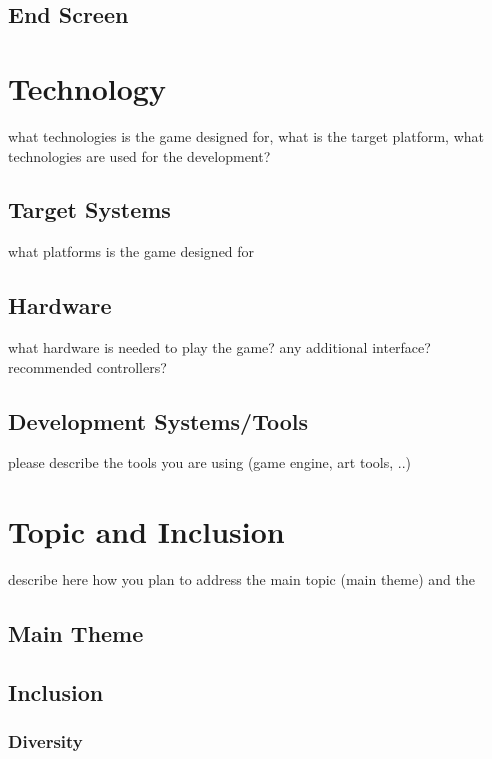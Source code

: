 \documentclass[a4paper]{scrreprt}
\begin{document}
\section{End Screen}



\chapter{Technology}
what technologies is the game designed for, what is the target platform, what technologies are used for the development? 

\section{Target Systems}
what platforms is the game designed for

\section{Hardware}
what hardware is needed to play the game? any additional interface? recommended controllers? 

\section{Development Systems/Tools}
please describe the tools you are using (game engine, art tools, ..) 



\chapter{Topic and Inclusion }

describe here how you plan to address the main topic (main theme) and the 

\section{Main Theme}
\section{Inclusion}

\subsection{Diversity}
\end{document}
